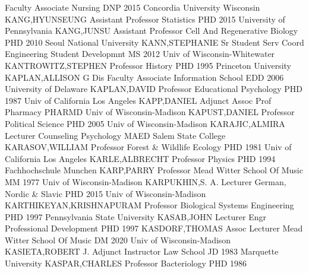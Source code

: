 \documentclass[
]{article}
\begin{document}
 \textbar Faculty Associate \textbar Nursing \textbar DNP
2015 Concordia University Wisconsin \textbar KANG,HYUNSEUNG \textbar{}
 \textbar Assistant Professor \textbar Statistics
\textbar PHD 2015 University of Pennsylvania \textbar KANG,JUNSU
\textbar{}  \textbar Assistant Professor \textbar Cell And
Regenerative Biology \textbar PHD 2010 Seoul National University
\textbar KANN,STEPHANIE \textbar{}  \textbar Sr Student Serv
Coord \textbar Engineering Student Developmnt \textbar MS 2012 Univ of
Wisconsin-Whitewater \textbar KANTROWITZ,STEPHEN \textbar{} 
\textbar Professor \textbar History \textbar PHD 1995 Princeton
University \textbar KAPLAN,ALLISON G \textbar{} 
\textbar Dis Faculty Associate \textbar Information School \textbar EDD
2006 University of Delaware \textbar KAPLAN,DAVID \textbar{}
 \textbar Professor \textbar Educational Psychology
\textbar PHD 1987 Univ of California Los Angeles \textbar KAPP,DANIEL
\textbar{}  \textbar Adjunct Assoc Prof \textbar Pharmacy
\textbar PHARMD Univ of Wisconsin-Madison \textbar KAPUST,DANIEL
\textbar{}  \textbar Professor \textbar Political Science
\textbar PHD 2005 Univ of Wisconsin-Madison \textbar KARAJIC,ALMIRA
\textbar{}  \textbar Lecturer \textbar Counseling Psychology
\textbar MAED Salem State College \textbar KARASOV,WILLIAM \textbar{}
 \textbar Professor \textbar Forest \& Wildlife Ecology
\textbar PHD 1981 Univ of California Los Angeles \textbar KARLE,ALBRECHT
\textbar{}  \textbar Professor \textbar Physics \textbar PHD
1994 Fachhochschule Munchen \textbar KARP,PARRY \textbar{} 
\textbar Professor \textbar Mead Witter School Of Music \textbar MM 1977
Univ of Wisconsin-Madison \textbar KARPUKHIN,S. A. \textbar{}
 \textbar Lecturer \textbar German, Nordic \& Slavic
\textbar PHD 2015 Univ of Wisconsin-Madison
\textbar KARTHIKEYAN,KRISHNAPURAM \textbar{} 
\textbar Professor \textbar Biological Systems Engineering \textbar PHD
1997 Pennsylvania State University \textbar KASAB,JOHN \textbar{}
 \textbar Lecturer \textbar Engr Professional Development
\textbar PHD 1997 \textbar KASDORF,THOMAS \textbar{} 
\textbar Assoc Lecturer \textbar Mead Witter School Of Music \textbar DM
2020 Univ of Wisconsin-Madison \textbar KASIETA,ROBERT J. \textbar{}
 \textbar Adjunct Instructor \textbar Law School \textbar JD
1983 Marquette University \textbar KASPAR,CHARLES \textbar{}
 \textbar Professor \textbar Bacteriology \textbar PHD 1986
\end{document}
